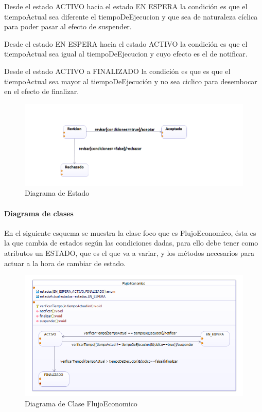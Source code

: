 Desde el estado ACTIVO hacia el estado EN ESPERA la condición es que el tiempoActual sea diferente el tiempoDeEjecucion y que sea de naturaleza cíclica para poder pasar al efecto de suspender.

Desde el estado EN ESPERA hacia el estado ACTIVO la condición es que el tiempoActual sea igual al tiempoDeEjecucion y cuyo efecto es el de notificar.

Desde el estado ACTIVO a FINALIZADO la condición es que es que el tiempoActual sea mayor al tiempoDeEjecución y no sea ciclico para desembocar en el efecto de finalizar.

\begin{figure}[H]
	\centering
	\includegraphics[width=1\linewidth]{parte2/imgs/DiagramaDeEstado/estados}
	\caption{Diagrama de Estado}
	\label{fig:diagramaEstado}
\end{figure}

\paragraph{Diagrama de clases} 

En el siguiente esquema se muestra la clase foco que es FlujoEconomico, ésta es la que cambia de estados según las condiciones dadas, para ello debe tener como atributos un ESTADO, que es el que va a variar, y los métodos necesarios para actuar a la hora de cambiar de estado.

\begin{figure}[H]
	\centering
	\includegraphics[width=1\linewidth]{parte2/imgs/DiagramaDeEstado/clase}
	\caption{Diagrama de Clase FlujoEconomico}
	\label{fig:diagramaEstadoClase}
\end{figure}

